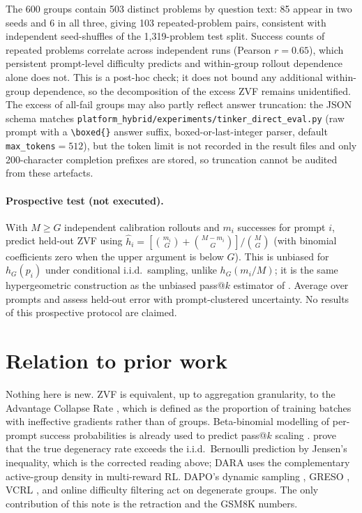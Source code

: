 \documentclass[11pt]{article}
\begin{document}
The 600 groups contain 503 distinct problems by question text: 85 appear in
two seeds and 6 in all three, giving 103 repeated-problem pairs, consistent
with independent seed-shuffles of the 1{,}319-problem test split. Success
counts of repeated problems correlate across independent runs (Pearson
$r=0.65$), which persistent prompt-level difficulty predicts and within-group
rollout dependence alone does not. This is a post-hoc check; it does not bound
any additional within-group dependence, so the decomposition of the excess ZVF
remains unidentified. The excess of all-fail groups may also partly reflect
answer truncation: the JSON schema matches
\nolinkurl{platform_hybrid/experiments/tinker_direct_eval.py} (raw prompt with a
\verb|\boxed{}| answer suffix, boxed-or-last-integer parser, default
\texttt{max\_tokens}${}=512$), but the token limit is not recorded in the result
files and only 200-character completion prefixes are stored, so truncation
cannot be audited from these artefacts.

\paragraph{Prospective test (not executed).}
With $M\ge G$ independent calibration rollouts and $m_i$ successes for prompt
$i$, predict held-out ZVF using
$\widehat h_i=[\binom{m_i}{G}+\binom{M-m_i}{G}]/\binom{M}{G}$
(with binomial coefficients zero when the upper argument is below $G$).
This is unbiased for $h_G(p_i)$ under conditional i.i.d.\ sampling, unlike
$h_G(m_i/M)$; it is the same hypergeometric construction as the unbiased
pass@$k$ estimator of \citet{chen2021codex}. Average over prompts and assess held-out error with
prompt-clustered uncertainty. No results of this prospective protocol are claimed.

\section{Relation to prior work}
Nothing here is new. ZVF is equivalent, up to aggregation granularity, to the
Advantage Collapse Rate \citep{he2026advantage}, which is defined as the
proportion of training batches with ineffective gradients rather than of
groups. Beta-binomial modelling of per-prompt success probabilities is already
used to predict pass@$k$ scaling \citep{kazdan2025passk}. \citet{nie2026gradstarvation}
prove that the true degeneracy rate exceeds the i.i.d.\ Bernoulli prediction
by Jensen's inequality, which is the corrected reading above; DARA
\citep{zheng2026dara} uses the complementary active-group density in
multi-reward RL. DAPO's dynamic sampling \citep{yu2025dapo}, GRESO
\citep{zhang2026greso}, VCRL \citep{jiang2025vcrl}, and online difficulty
filtering \citep{bae2025online} act on degenerate groups. The only
contribution of this note is the retraction and the GSM8K numbers.
\end{document}
